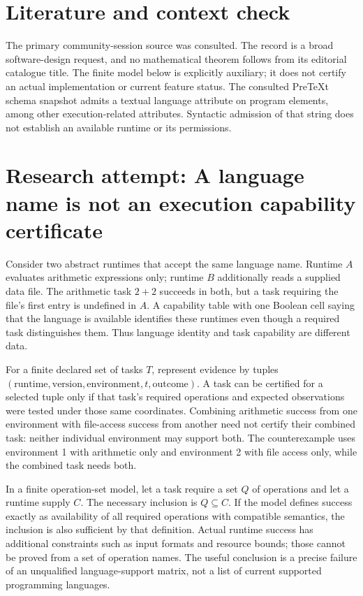 \documentclass[11pt]{article}
\begin{document}
\section{Literature and context check}
The primary community-session source was consulted. The record is a broad software-design request, and no mathematical theorem follows from its editorial catalogue title. The finite model below is explicitly auxiliary; it does not certify an actual implementation or current feature status. The consulted PreTeXt schema snapshot admits a textual language attribute on program elements, among other execution-related attributes. Syntactic admission of that string does not establish an available runtime or its permissions.
\section{Research attempt: A language name is not an execution capability certificate}
Consider two abstract runtimes that accept the same language name. Runtime $A$ evaluates arithmetic expressions only; runtime $B$ additionally reads a supplied data file. The arithmetic task $2+2$ succeeds in both, but a task requiring the file's first entry is undefined in $A$. A capability table with one Boolean cell saying that the language is available identifies these runtimes even though a required task distinguishes them. Thus language identity and task capability are different data.

For a finite declared set of tasks $T$, represent evidence by tuples $(\text{runtime},\text{version},\text{environment},t,\text{outcome})$. A task can be certified for a selected tuple only if that task's required operations and expected observations were tested under those same coordinates. Combining arithmetic success from one environment with file-access success from another need not certify their combined task: neither individual environment may support both. The counterexample uses environment 1 with arithmetic only and environment 2 with file access only, while the combined task needs both.

In a finite operation-set model, let a task require a set $Q$ of operations and let a runtime supply $C$. The necessary inclusion is $Q\subseteq C$. If the model defines success exactly as availability of all required operations with compatible semantics, the inclusion is also sufficient by that definition. Actual runtime success has additional constraints such as input formats and resource bounds; those cannot be proved from a set of operation names. The useful conclusion is a precise failure of an unqualified language-support matrix, not a list of current supported programming languages.
\end{document}
